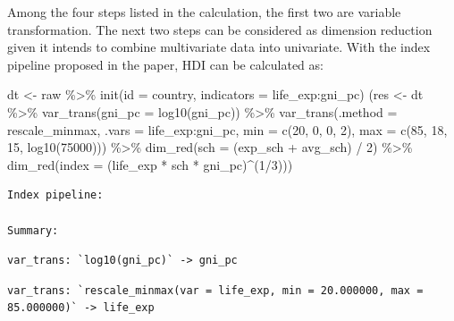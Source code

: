 \documentclass[
]{article}
\newenvironment{Shaded}{\begin{snugshade}}{\end{snugshade}}
\newcommand{\AttributeTok}[1]{\textcolor[rgb]{0.40,0.45,0.13}{#1}}
\newcommand{\DecValTok}[1]{\textcolor[rgb]{0.68,0.00,0.00}{#1}}
\newcommand{\FunctionTok}[1]{\textcolor[rgb]{0.28,0.35,0.67}{#1}}
\newcommand{\NormalTok}[1]{\textcolor[rgb]{0.00,0.23,0.31}{#1}}
\newcommand{\OtherTok}[1]{\textcolor[rgb]{0.00,0.23,0.31}{#1}}
\newcommand{\SpecialCharTok}[1]{\textcolor[rgb]{0.37,0.37,0.37}{#1}}
\begin{document}
Among the four steps listed in the calculation, the first two are
variable transformation. The next two steps can be considered as
dimension reduction given it intends to combine multivariate data into
univariate. With the index pipeline proposed in the paper, HDI can be
calculated as:

\begin{Shaded}
\begin{Highlighting}[]
\NormalTok{dt }\OtherTok{\textless{}{-}}\NormalTok{ raw }\SpecialCharTok{\%\textgreater{}\%} \FunctionTok{init}\NormalTok{(}\AttributeTok{id =}\NormalTok{ country, }\AttributeTok{indicators =}\NormalTok{ life\_exp}\SpecialCharTok{:}\NormalTok{gni\_pc)}
\NormalTok{(res }\OtherTok{\textless{}{-}}\NormalTok{ dt }\SpecialCharTok{\%\textgreater{}\%}
  \FunctionTok{var\_trans}\NormalTok{(}\AttributeTok{gni\_pc =} \FunctionTok{log10}\NormalTok{(gni\_pc)) }\SpecialCharTok{\%\textgreater{}\%} 
  \FunctionTok{var\_trans}\NormalTok{(}\AttributeTok{.method =}\NormalTok{ rescale\_minmax, }\AttributeTok{.vars =}\NormalTok{ life\_exp}\SpecialCharTok{:}\NormalTok{gni\_pc,}
            \AttributeTok{min =} \FunctionTok{c}\NormalTok{(}\DecValTok{20}\NormalTok{, }\DecValTok{0}\NormalTok{, }\DecValTok{0}\NormalTok{, }\DecValTok{2}\NormalTok{), }\AttributeTok{max =} \FunctionTok{c}\NormalTok{(}\DecValTok{85}\NormalTok{, }\DecValTok{18}\NormalTok{, }\DecValTok{15}\NormalTok{, }\FunctionTok{log10}\NormalTok{(}\DecValTok{75000}\NormalTok{))) }\SpecialCharTok{\%\textgreater{}\%} 
  \FunctionTok{dim\_red}\NormalTok{(}\AttributeTok{sch =}\NormalTok{ (exp\_sch }\SpecialCharTok{+}\NormalTok{ avg\_sch) }\SpecialCharTok{/} \DecValTok{2}\NormalTok{) }\SpecialCharTok{\%\textgreater{}\%}
  \FunctionTok{dim\_red}\NormalTok{(}\AttributeTok{index =}\NormalTok{ (life\_exp }\SpecialCharTok{*}\NormalTok{ sch }\SpecialCharTok{*}\NormalTok{ gni\_pc)}\SpecialCharTok{\^{}}\NormalTok{(}\DecValTok{1}\SpecialCharTok{/}\DecValTok{3}\NormalTok{)))}
\end{Highlighting}
\end{Shaded}

\begin{verbatim}
Index pipeline: 

Summary: 
\end{verbatim}

\begin{verbatim}
var_trans: `log10(gni_pc)` -> gni_pc
\end{verbatim}

\begin{verbatim}
var_trans: `rescale_minmax(var = life_exp, min = 20.000000, max = 85.000000)` -> life_exp
\end{verbatim}
\end{document}
